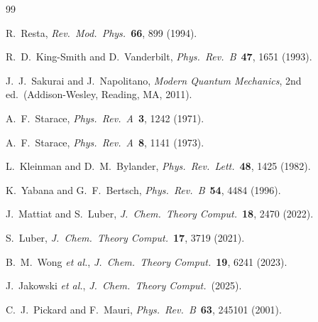 \documentclass[11pt]{article}
\begin{document}


\begin{thebibliography}{99}

R.~Resta,
\textit{Rev.\ Mod.\ Phys.}\ \textbf{66}, 899 (1994).

R.~D.\ King-Smith and D.~Vanderbilt,
\textit{Phys.\ Rev.\ B}\ \textbf{47}, 1651 (1993).

J.~J.\ Sakurai and J.~Napolitano,
\textit{Modern Quantum Mechanics}, 2nd ed.\
(Addison-Wesley, Reading, MA, 2011).

A.~F.\ Starace,
\textit{Phys.\ Rev.\ A}\ \textbf{3}, 1242 (1971).

A.~F.\ Starace,
\textit{Phys.\ Rev.\ A}\ \textbf{8}, 1141 (1973).

L.~Kleinman and D.~M.\ Bylander,
\textit{Phys.\ Rev.\ Lett.}\ \textbf{48}, 1425 (1982).

K.~Yabana and G.~F.\ Bertsch,
\textit{Phys.\ Rev.\ B}\ \textbf{54}, 4484 (1996).

J.~Mattiat and S.~Luber,
\textit{J.\ Chem.\ Theory Comput.}\ \textbf{18}, 2470 (2022).

S.~Luber,
\textit{J.\ Chem.\ Theory Comput.}\ \textbf{17}, 3719 (2021).

B.~M.\ Wong \textit{et al.},
\textit{J.\ Chem.\ Theory Comput.}\ \textbf{19}, 6241 (2023).

J.~Jakowski \textit{et al.},
\textit{J.\ Chem.\ Theory Comput.}\ (2025).

C.~J.\ Pickard and F.~Mauri,
\textit{Phys.\ Rev.\ B}\ \textbf{63}, 245101 (2001).

\end{thebibliography}
\end{document}
